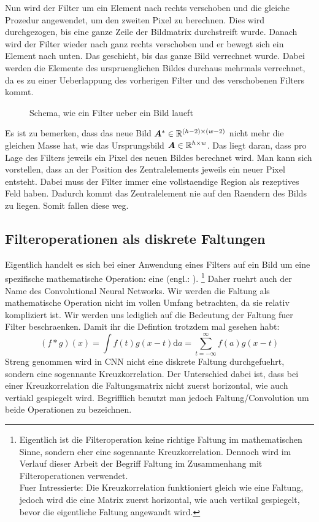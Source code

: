 Nun wird der Filter um ein Element nach rechts verschoben und die gleiche
Prozedur angewendet, um den zweiten Pixel zu berechnen. Dies
wird durchgezogen, bis eine ganze Zeile der Bildmatrix durchstreift wurde.
Danach wird der Filter wieder nach ganz rechts verschoben und er bewegt sich ein
Element nach unten. Das geschieht, bis das ganze Bild verrechnet wurde.
Dabei werden die Elemente des urspruenglichen Bildes durchaus mehrmals
verrechnet, da es zu einer Ueberlappung des vorherigen Filter und des
verschobenen Filters kommt.

\begin{figure}[h!]

  \caption{Schema, wie ein Filter ueber ein Bild laueft}
\end{figure}

Es ist zu bemerken, dass das neue Bild $\bm{A}^* \in \mathbb{R}^{(h-2) \times (w-2)}$ nicht mehr die gleichen Masse
hat, wie das Ursprungsbild $\bm{A} \in \mathbb{R}^{h \times w}$. Das liegt daran, dass pro
Lage des Filters jeweils ein Pixel des neuen Bildes berechnet wird. Man kann
sich vorstellen, dass an der Position des Zentralelements jeweils ein neuer
Pixel entsteht. Dabei muss der Filter immer eine vollstaendige Region als
rezeptives Feld haben. Dadurch kommt das Zentralelement nie auf den Raendern des
Bilds zu liegen. Somit fallen diese weg.
\para{}
\cite{deeplearning.ai:cnn}
\cite{wiki:convolution}

\subsection{Filteroperationen als diskrete Faltungen}
Eigentlich handelt es sich bei einer Anwendung eines Filters auf ein Bild um
eine spezifische mathematische Operation: eine  (engl.:
).
\footnote{
  Eigentlich ist die Filteroperation keine richtige Faltung im mathematischen
  Sinne, sondern eher eine sogennante Kreuzkorrelation. Dennoch wird im Verlauf
  dieser Arbeit der Begriff Faltung im Zusammenhang mit Filteroperationen verwendet.\\
  Fuer Intressierte: Die Kreuzkorrelation funktioniert gleich wie eine Faltung,
  jedoch wird die eine Matrix zuerst horizontal, wie auch vertikal gespiegelt,
  bevor die eigentliche Faltung angewandt wird.
}
Daher ruehrt auch der Name des Convolutional Neural Networks.
Wir werden die Faltung als mathematische Operation nicht im vollen Umfang
betrachten, da sie relativ kompliziert ist. Wir werden uns lediglich auf die
Bedeutung der Faltung fuer Filter beschraenken.
Damit ihr die Defintion trotzdem mal gesehen habt:
\begin{equation}
  (f * g)(x) = \int f(t) g(x-t) \text{d}a = \sum_{t=-\infty}^\infty f(a)g(x-t)
\end{equation}
\para{}
Streng genommen wird in CNN nicht eine diskrete Faltung durchgefuehrt, sondern
eine sogennante Kreuzkorrelation. Der Unterschied dabei ist, dass bei einer
Kreuzkorrelation die Faltungsmatrix nicht zuerst horizontal, wie auch vertiakl
gespiegelt wird. Begrifflich benutzt man jedoch Faltung/Convolution um beide
Operationen zu bezeichnen.

